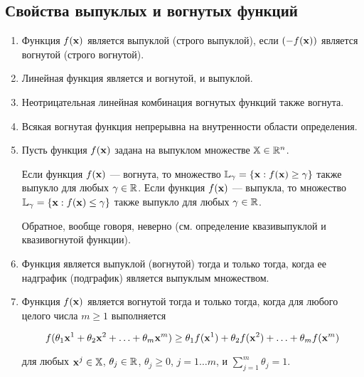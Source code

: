 

\subsection{Свойства выпуклых и вогнутых функций}

\begin{enumerate}
\renewcommand{\theenumi}{(\roman{enumi})}

  \item Функция $f(\mathbf{x})$ является выпуклой
(строго выпуклой), если $(-f(\mathbf{x}))$ является вогнутой (строго
вогнутой).

  \item Линейная функция является и вогнутой, и выпуклой.

  \item Неотрицательная линейная комбинация вогнутых функций также
  вогнута.

  \item Всякая вогнутая функция непрерывна на внутренности области
  определения.

  \item Пусть функция $f(\mathbf{x})$ задана на выпуклом множестве $\mathbb{X} \in
  \mathbb{R}^n$.

  Если функция $f(\mathbf{x})$ --- вогнута, то множество $\mathbb{L}_{\gamma}= \{ \mathbf{x}: f(\mathbf{x}) \geq \gamma
  \}$ также выпукло для любых $\gamma \in \mathbb{R}$. Если функция $f(\mathbf{x})$ --- выпукла,
  то множество $\mathbb{L}_{\gamma}= \{ \mathbf{x}: f(\mathbf{x}) \leq \gamma \}$ также выпукло для любых $\gamma \in \mathbb{R}$.

  Обратное, вообще говоря, неверно (см. определение квазивыпуклой и квазивогнутой функции).

  \item Функция является выпуклой (вогнутой) тогда и только тогда,
  когда ее надграфик (подграфик) является выпуклым множеством.

  \item Функция $f(\mathbf{x})$ является вогнутой тогда и только тогда,
  когда для любого целого числа $m \geq 1$ выполняется

  \[
    f(\theta_1 \mathbf{x}^1 +\theta_2 \mathbf{x}^2+ \ldots +\theta_m
    \mathbf{x}^m) \geq \theta_1 f(\mathbf{x}^1) +\theta_2 f(\mathbf{x}^2)+ \ldots +\theta_m
    f(\mathbf{x}^m)
  \]

\noindent для любых $\mathbf{x}^j \in \mathbb{X}$, $\theta_j \in \mathbb{R}$,
$\theta_j \geq 0$, $j=1 \ldots m$, и $\sum \limits _{j=1}^{m}
\theta_j=1$.


\end{enumerate}

